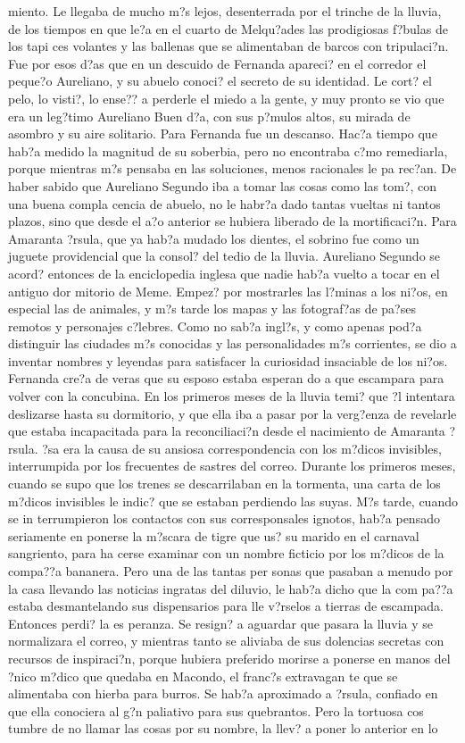  miento. Le llegaba de mucho m?s lejos, desenterrada por el trinche de la lluvia, de los tiempos en que le?a en el cuarto de Melqu?ades las prodigiosas f?bulas de los tapi ces volantes y las ballenas que se alimentaban de barcos con tripulaci?n. Fue por esos d?as que en un descuido de Fernanda apareci? en el corredor el peque?o Aureliano, y su abuelo conoci? el secreto de su identidad. Le cort? el pelo, lo visti?, lo ense?? a perderle el miedo a la gente, y muy pronto se vio que era un leg?timo Aureliano Buen d?a, con sus p?mulos altos, su mirada de asombro y su aire solitario. Para Fernanda fue un descanso. Hac?a tiempo que hab?a medido la magnitud de su soberbia, pero no encontraba c?mo remediarla, porque mientras m?s pensaba en las soluciones, menos racionales le pa rec?an. De haber sabido que Aureliano Segundo iba a tomar las cosas como las tom?, con una buena compla cencia de abuelo, no le habr?a dado tantas vueltas ni tantos plazos, sino que desde el a?o anterior se hubiera liberado de la mortificaci?n. Para Amaranta ?rsula, que ya hab?a mudado los dientes, el sobrino fue como un juguete providencial que la consol? del tedio de la lluvia. Aureliano Segundo se acord? entonces de la enciclopedia inglesa que nadie hab?a vuelto a tocar en el antiguo dor mitorio de Meme. Empez? por mostrarles las l?minas a los ni?os, en especial las de animales, y m?s tarde los mapas y las fotograf?as de pa?ses remotos y personajes c?lebres. Como no sab?a ingl?s, y como apenas pod?a distinguir las ciudades m?s conocidas y las personalidades m?s corrientes, se dio a inventar nombres y leyendas para satisfacer la curiosidad insaciable de los ni?os. Fernanda cre?a de veras que su esposo estaba esperan do a que escampara para volver con la concubina. En los primeros meses de la lluvia temi? que ?l intentara deslizarse hasta su dormitorio, y que ella iba a pasar por la verg?enza de revelarle que estaba incapacitada para la reconciliaci?n desde el nacimiento de Amaranta ?rsula. ?sa era la causa de su ansiosa correspondencia con los m?dicos invisibles, interrumpida por los frecuentes de sastres del correo. Durante los primeros meses, cuando se supo que los trenes se descarrilaban en la tormenta, una carta de los m?dicos invisibles le indic? que se estaban perdiendo las suyas. M?s tarde, cuando se in terrumpieron los contactos con sus corresponsales ignotos, hab?a pensado seriamente en ponerse la m?scara de tigre que us? su marido en el carnaval sangriento, para ha cerse examinar con un nombre ficticio por los m?dicos de la compa??a bananera. Pero una de las tantas per sonas que pasaban a menudo por la casa llevando las noticias ingratas del diluvio, le hab?a dicho que la com pa??a estaba desmantelando sus dispensarios para lle v?rselos a tierras de escampada. Entonces perdi? la es peranza. Se resign? a aguardar que pasara la lluvia y se normalizara el correo, y mientras tanto se aliviaba de sus dolencias secretas con recursos de inspiraci?n, porque hubiera preferido morirse a ponerse en manos del ?nico m?dico que quedaba en Macondo, el franc?s extravagan te que se alimentaba con hierba para burros. Se hab?a aproximado a ?rsula, confiado en que ella conociera al g?n paliativo para sus quebrantos. Pero la tortuosa cos tumbre de no llamar las cosas por su nombre, la llev? a poner lo anterior en lo 